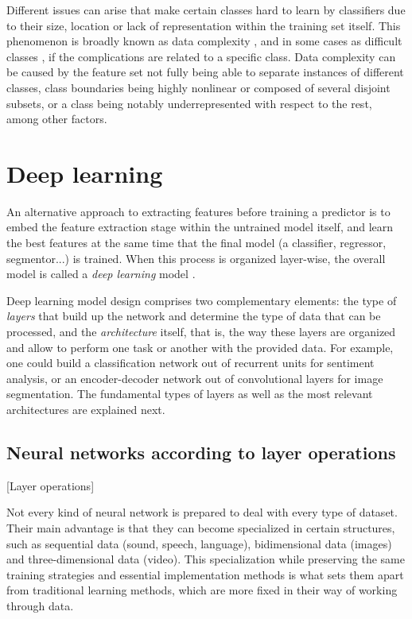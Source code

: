Different issues can arise that make certain classes hard to learn by classifiers due to their size, location or lack of representation within the training set itself. This phenomenon is broadly known as data complexity , and in some cases as difficult classes , if the complications are related to a specific class. Data complexity can be caused by the feature set not fully being able to separate instances of different classes, class boundaries being highly nonlinear or composed of several disjoint subsets, or a class being notably underrepresented with respect to the rest, among other factors.


\section{Deep learning}

An alternative approach to extracting features before training a predictor 
is to embed the feature extraction stage within the untrained model itself, and learn the best features at the same time that the final model (a classifier, regressor, segmentor...) is trained. When this process is organized layer-wise, the overall model is called a \textit{deep learning} model .

Deep learning model design comprises two complementary elements: the type of \textit{layers} that build up the network and determine the type of data that can be processed, and the \textit{architecture} itself, that is, the way these layers are organized and allow to perform one task or another with the provided data. For example, one could build a classification network out of recurrent units for sentiment analysis, or an encoder-decoder network out of convolutional layers for image segmentation. The fundamental types of layers as well as the most relevant architectures are explained next.

\subsection{Neural networks according to layer operations}[Layer operations]\label{sec:layers}

Not every kind of neural network is prepared to deal with every type of dataset. Their main advantage is that they can become specialized in certain structures, such as sequential data (sound, speech, language), bidimensional data (images) and three-dimensional data (video). This specialization while preserving the same training strategies and essential implementation methods is what sets them apart from traditional learning methods, which are more fixed in their way of working through data.

